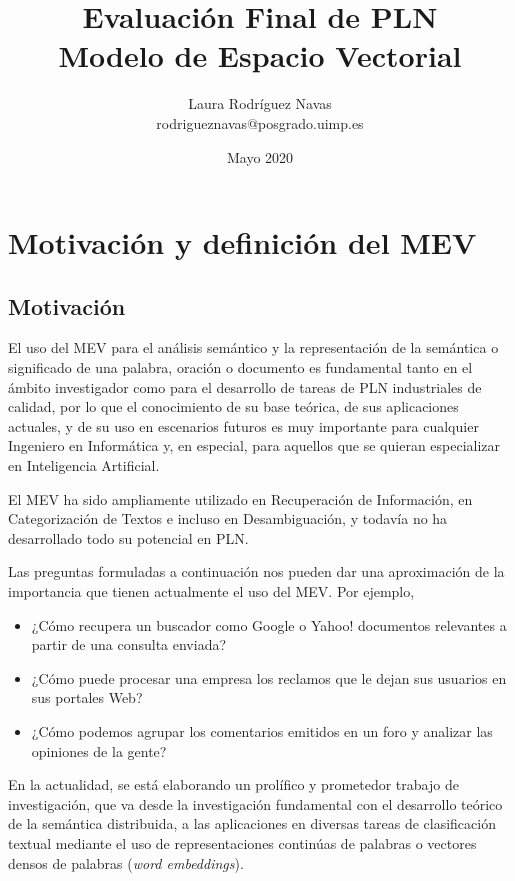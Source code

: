 \documentclass[titlepage]{article}
\title{Evaluación Final de PLN \\ Modelo de Espacio Vectorial}
\author{Laura Rodríguez Navas \\ rodrigueznavas@posgrado.uimp.es}
\date{Mayo 2020}
\begin{document}
	
	\maketitle
	
	\renewcommand{\contentsname}{Índice}
	\tableofcontents
	
	\newpage
	\section{Motivación y definición del MEV}
	
	\subsection{Motivación}
	
	El uso del MEV para el análisis semántico y la representación de la semántica o significado de una palabra, oración o documento es fundamental tanto en el ámbito investigador como para el desarrollo de tareas de PLN industriales de calidad, por lo que el conocimiento de su base teórica, de sus aplicaciones actuales, y de su uso en escenarios futuros es muy importante para cualquier Ingeniero en Informática y, en especial, para aquellos que se quieran especializar en Inteligencia Artificial.
	
	El MEV ha sido ampliamente utilizado en Recuperación de Información, en Categorización de Textos e incluso en Desambiguación, y todavía no ha desarrollado todo su potencial en PLN. 
	
	Las preguntas formuladas a continuación nos pueden dar una aproximación de la importancia que tienen actualmente el uso del MEV. Por ejemplo,
	
	\begin{itemize}
		\item ¿Cómo recupera un buscador como Google o Yahoo! documentos relevantes a partir de una consulta enviada?
		\item ¿Cómo puede procesar una empresa los reclamos que le dejan sus usuarios en sus portales Web?
		\item 
		¿Cómo podemos agrupar los comentarios emitidos en un foro y analizar las opiniones de la gente?
	\end{itemize}
	
	En la actualidad, se está elaborando un prolífico y prometedor trabajo de investigación, que va desde la investigación fundamental con el desarrollo teórico de la semántica distribuida, a las aplicaciones en diversas tareas de clasificación textual mediante el uso de representaciones continúas de palabras o vectores densos de palabras (\textit{word embeddings}). 
	
\end{document}
